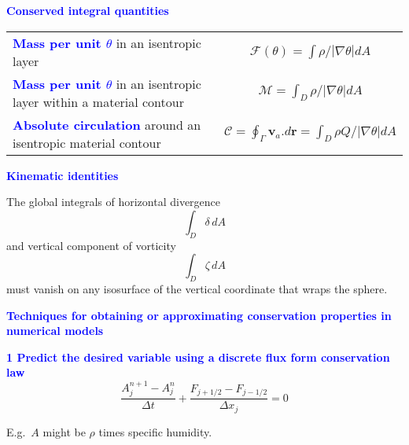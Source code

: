 \documentclass[a4]{seminar}
\newcommand{\B}[1]{\textcolor{blue}{#1}}
\begin{document}

\begin{slide}

\B{\bf Conserved integral quantities}

\begin{tabular}{|p{45mm}c|}
\hline
\B{\bf Mass per unit \( \theta \)} in an isentropic layer
&
\( \mathcal{F}(\theta )=\int \rho /\left| \nabla \theta \right| dA \)
\\
\B{\bf Mass per unit \( \theta \)} in an isentropic layer within a material contour
&
\( \mathcal{M}=\int_{D}\rho /\left| \nabla \theta \right| dA \)
\\
\B{\bf Absolute circulation} around an isentropic material contour
&
\( \mathcal{C}=\oint_{\Gamma }\mathbf{v}_{a}.d\mathbf{r}
=\int_{D}\rho Q/\left| \nabla \theta \right| dA \)
\\
\hline
\end{tabular}


\end{slide}


\begin{slide}

\B{\bf Kinematic identities}

\vspace{2mm}

The global integrals of horizontal divergence
\begin{displaymath}
\int_{D} \delta \, dA
\end{displaymath}
and vertical component of vorticity
\begin{displaymath}
\int_{D} \zeta \, dA
\end{displaymath}
must vanish
on any isosurface of the vertical coordinate that wraps the sphere.


\end{slide}


\begin{slide}

\B{\bf Techniques for obtaining or approximating conservation
properties in numerical models}

\vspace{3mm}

\B{\bf 1 Predict the desired variable using a discrete 
flux form conservation law}
\begin{displaymath}
\frac{A_j^{n+1} - A_j^{n}}{\Delta t} + 
\frac{F_{j+1/2} - F_{j-1/2}}{\Delta x_j} = 0
\end{displaymath}


E.g.\ \( A \) might be \( \rho \) times specific humidity.



\end{slide}
\end{document}
